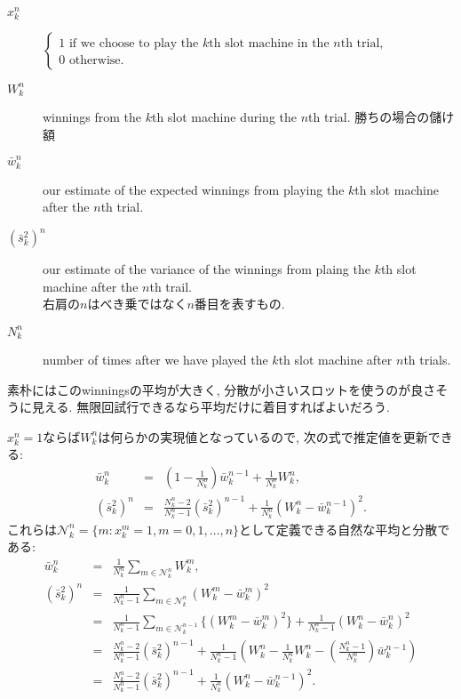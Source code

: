 \documentclass[11pt]{jsbook}
\begin{document}
\begin{description}
	\item[$x_k^n$] $\begin{cases}1 \textrm{ if we choose to play the $k$th slot machine in the $n$th trial,} \\
								 0 \textrm{ otherwise.} \end{cases}$
	\item[$W_k^n$] winnings from the $k$th slot machine during the $n$th trial.
	勝ちの場合の儲け額
	\item[$\bar{w}_k^n$] our estimate of the expected winnings from playing the $k$th slot machine after the $n$th trial.
	\item[$(\bar{s}_k^2)^n$] our estimate of the variance of the winnings from plaing the $k$th slot machine after the $n$th trail.
	\\
	右肩の$n$はべき乗ではなく$n$番目を表すもの.
	\item[$N_k^n$] number of times after we have played the $k$th slot machine after $n$th trials.
\end{description}
素朴にはこのwinningsの平均が大きく, 分散が小さいスロットを使うのが良さそうに見える.
無限回試行できるなら平均だけに着目すればよいだろう.

$x_k^n = 1$ならば$W_k^n$は何らかの実現値となっているので, 次の式で推定値を更新できる:
\begin{eqnarray}
	\bar{w}_k^n &=& \left( 1 - \frac{1}{N_k^n} \right) \bar{w}_k^{n-1} + \frac{1}{N_k^n} W_k^n, \\
	(\bar{s}_k^2)^n &=& \frac{N_k^n - 2}{N_k^n -1} (\bar{s}_k^2)^{n-1} + \frac{1}{N_k^n}(W_k^n-\bar{w}_k^{n-1})^2.
\end{eqnarray}
これらは$\mathcal{N}_k^n=\{m: x_k^m = 1, m=0,1,\dots,n \}$として定義できる自然な平均と分散である:
\begin{eqnarray*}
	\bar{w}_k^n &=& \frac{1}{N_k^n} \sum_{m \in \mathcal{N}_k^n} W_k^m, \\
	(\bar{s}_k^2)^n &=& \frac{1}{N_k^n - 1} \sum_{m \in \mathcal{N}_k^n} (W_k^m - \bar{w}_k^m)^2\\
	&=& \frac{1}{N_k^n - 1} \sum_{m \in \mathcal{N}_k^{n-1}}\{(W_k^m - \bar{w}_k^m)^2\} + \frac{1}{N_k^n - 1} (W_k^{n} - \bar{w}_k^{n})^2\\
	&=& \frac{N_k^n-2}{N_k^n - 1} (\bar{s}_k^2)^{n-1}
		+ \frac{1}{N_k^n-1}\left(W_k^n - \frac{1}{N_k^n}W_k^n - (\frac{N_k^n-1}{N_k^n})\bar{w}_k^{n-1} \right)\\
	&=& \frac{N_k^n - 2}{N_k^n -1} (\bar{s}_k^2)^{n-1} + \frac{1}{N_k^n}(W_k^n-\bar{w}_k^{n-1})^2.
\end{eqnarray*}
\end{document}
